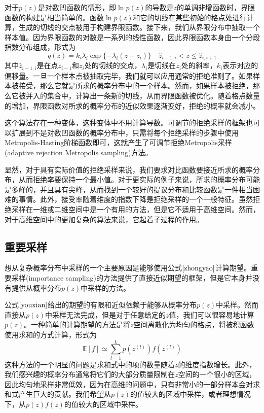 对于$p(z)$是对数凹函数的情形，即$\ln p(z)$的导数是$z$的单调非增函数时，界限函数的构建是相当简单的。函数$\ln p(z)$和它的切线在某些初始的格点处进行计算，生成的切线的交点被用于构建界限函数。接下来，我们从界限分布中抽取一个样本值。因为界限函数的对数是一系列的线性函数，因此界限函数本身由一个分段指数分布组成，形式为
\begin{equation}
	q(z)=k_i\lambda_i\exp \{-\lambda_i(z-z_i) \}\quad \hat{z}_{i-1,i}<z\leqslant \hat{z}_{i,i+1}
\end{equation}
其中$\hat{z}_{i-1,i}$是在点$z_{i-1}$和$z_i$处的切线的交点，$\lambda_i$是切线在$z_i$处的斜率，$k_i$表示对应的偏移量。一旦一个样本点被抽取完毕，我们就可以应用通常的拒绝准则了。如果样本被接受，那么它就是所求的概率分布中的一个样本。然而，如果样本被拒绝，那么它被并入的集合中，计算出一条新的切线，从而界限函数被优化。随着格点数量的增加，界限函数对所求的概率分布的近似效果逐渐变好，拒绝的概率就会减小。

这个算法存在一种变体，这种变体中不用计算导数。可调节的拒绝采样的框架也可以扩展到不是对数凹函数的概率分布中，只需将每个拒绝采样的步骤中使用Metropolis-Hasting阶梯函数即可，这就产生了可调节拒绝Metropolis采样(adaptive rejection Metropolis sampling)方法。

显然，对于具有实际价值的拒绝采样来说，我们要求对比函数要接近所求的概率分布，从而拒绝率要保持一个最小值。对于更实际的例子来说，所求的概率分布可能是多峰的，并且具有尖峰，从而找到一个较好的提议分布和比较函数是一件相当困难的事情。此外，接受率随着维度的指数下降是拒绝采样的一个一般特征。虽然拒绝采样在一维或二维空间中是一个有用的方法，但是它不适用于高维空间。然而，对于高维空间中的更加复杂的算法来说，它起着子过程的作用。
\subsection*{重要采样}
想从复杂概率分布中采样的一个主要原因是能够使用公式$\ref{zhongyao}$计算期望。重要采样(importance sampling)的方法提供了直接近似期望的框架，但是它本身并没有提供从概率分布$p(z)$中采样的方法。

公式$\ref{youxian}$给出的期望的有限和近似依赖于能够从概率分布$p(z)$中采样。然而直接从$p(z)$中采样无法完成，但是对于任意给定的$z$值，我们可以很容易地计算$p(z)$。一种简单的计算期望的方法是将$z$空间离散化为均匀的格点，将被积函数使用求和的方式计算，形式为
\begin{equation}
	\mathbb{E}[f]\simeq \sum_{l=1}^{L}p(z^{(l)})f(z^{(l)})
\end{equation}
这种方法的一个明显的问题是求和式中的项的数量随着$z$的维度指数增长。此外，我们感兴趣的概率分布通常将它们的大部分质量限制在$z$空间的一个很小的区域，因此均匀地采样非常低效，因为在高维的问题中，只有非常小的一部分样本会对求和式产生巨大的贡献。我们希望从$p(z)$的值较大的区域中采样，或者理想情况下，从$p(z)f(z)$的值较大的区域中采样。

